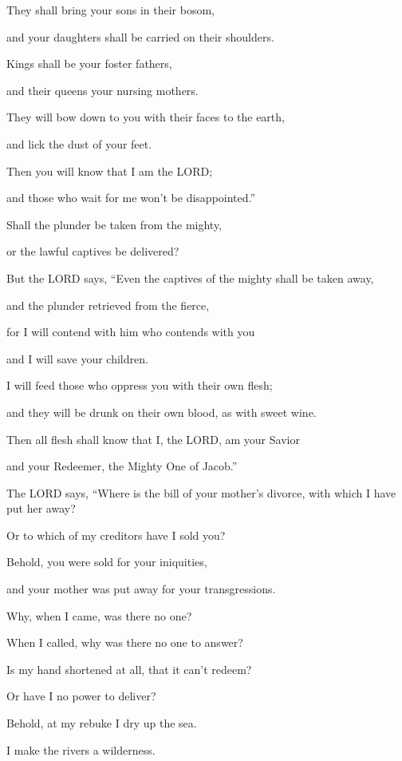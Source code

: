 They shall bring your sons in their bosom,

and your daughters shall be carried on their shoulders.

\myverse{}Kings shall be your foster fathers,

and their queens your nursing mothers.

They will bow down to you with their faces to the earth,

and lick the dust of your feet.

Then you will know that I am the LORD;

and those who wait for me won’t be disappointed.”


\vspace{\baselineskip} \myverse{}Shall the plunder be taken from the mighty,

or the lawful captives be delivered?

\myverse{}But the LORD says, “Even the captives of the mighty shall be
taken away,

and the plunder retrieved from the fierce,

for I will contend with him who contends with you

and I will save your children.

\myverse{}I will feed those who oppress you with their own flesh;

and they will be drunk on their own blood, as with sweet wine.

Then all flesh shall know that I, the LORD, am your Savior

and your Redeemer, the Mighty One of Jacob.”


\mychapter{} \myverse*{}The LORD says, “Where is the bill of your mother’s divorce, with
which I have put her away?

\quad\quad Or to which of my creditors have I sold you?

Behold, you were sold for your iniquities,

and your mother was put away for your transgressions.

\myverse{}Why, when I came, was there no one?

When I called, why was there no one to answer?

Is my hand shortened at all, that it can’t redeem?

Or have I no power to deliver?

Behold, at my rebuke I dry up the sea.

I make the rivers a wilderness.

